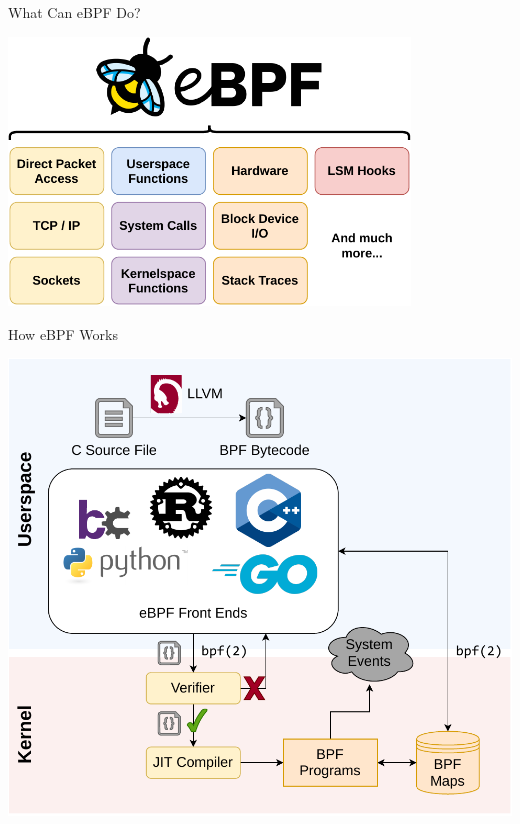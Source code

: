 \documentclass[12pt, dvipsnames]{beamer}
\begin{document}
\begin{frame}[c]{What Can eBPF Do?}
\begin{center}
    \color{black}
    \includegraphics[width=0.8\textwidth]{figs/ebpf-overview.pdf}
\end{center}
\end{frame}

\begin{frame}[c]{How eBPF Works}
\begin{center}
    \color{black}
    \includegraphics[height=0.8\textheight]{figs/how-ebpf-works.pdf}
\end{center}
\end{frame}
\end{document}
